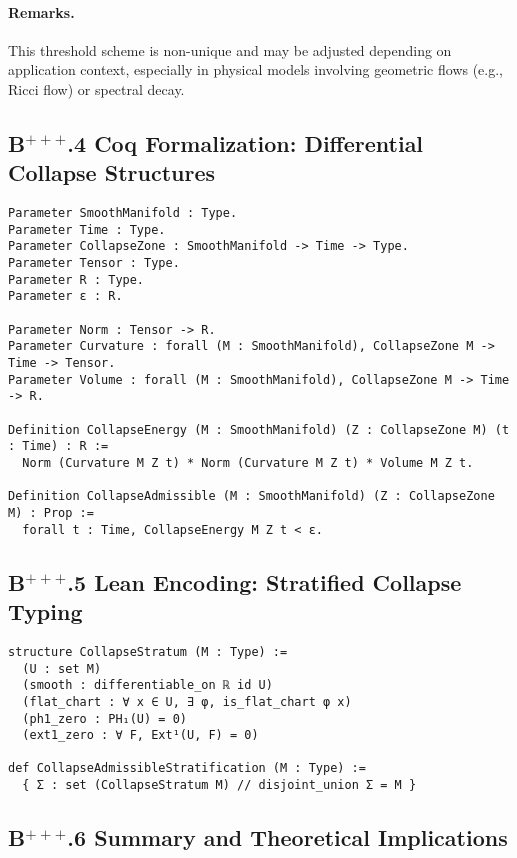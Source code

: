 \documentclass[11pt]{article}
\begin{document}
\paragraph{Remarks.}
This threshold scheme is non-unique and may be adjusted depending on application context, especially in physical models involving geometric flows (e.g., Ricci flow) or spectral decay.


\subsection*{B$^{+++}$.4 Coq Formalization: Differential Collapse Structures}

\begin{lstlisting}[language=Coq, caption={Differential Collapse Structures in Coq}]
Parameter SmoothManifold : Type.
Parameter Time : Type.
Parameter CollapseZone : SmoothManifold -> Time -> Type.
Parameter Tensor : Type.
Parameter R : Type.
Parameter ε : R.

Parameter Norm : Tensor -> R.
Parameter Curvature : forall (M : SmoothManifold), CollapseZone M -> Time -> Tensor.
Parameter Volume : forall (M : SmoothManifold), CollapseZone M -> Time -> R.

Definition CollapseEnergy (M : SmoothManifold) (Z : CollapseZone M) (t : Time) : R :=
  Norm (Curvature M Z t) * Norm (Curvature M Z t) * Volume M Z t.

Definition CollapseAdmissible (M : SmoothManifold) (Z : CollapseZone M) : Prop :=
  forall t : Time, CollapseEnergy M Z t < ε.
\end{lstlisting}

\subsection*{B$^{+++}$.5 Lean Encoding: Stratified Collapse Typing}

\begin{lstlisting}[language=Lean, caption={Stratified Collapse Structures in Lean}]
structure CollapseStratum (M : Type) :=
  (U : set M)
  (smooth : differentiable_on ℝ id U)
  (flat_chart : ∀ x ∈ U, ∃ φ, is_flat_chart φ x)
  (ph1_zero : PH₁(U) = 0)
  (ext1_zero : ∀ F, Ext¹(U, F) = 0)

def CollapseAdmissibleStratification (M : Type) :=
  { Σ : set (CollapseStratum M) // disjoint_union Σ = M }
\end{lstlisting}

\subsection*{B$^{+++}$.6 Summary and Theoretical Implications}
\end{document}
